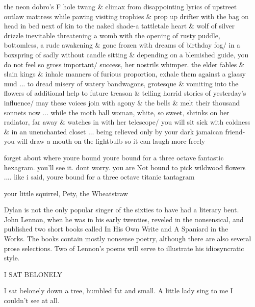    the neon dobro's F hole twang \& climax from disappointing lyrics of upstreet
   outlaw mattress while pawing visiting trophies \& prop up drifter with the bag on
   head in bed next of kin to the naked shade-a tattletale heart \& wolf of silver drizzle
   inevitable threatening a womb with the opening of rusty puddle, bottomless, a rude
   awakening \& gone frozen with dreams of birthday fog/ in a boxspring of sadly
   without candle sitting \& depending on a blemished guide, you do not feel so gross
   important/ success, her nostrils whimper. the elder fables \& slain kings \& inhale
   manners of furious proportion, exhale them against a glassy mud ... to dread misery
   of watery bandwagons, grotesque \& vomiting into the flowers of additional help to
   future treason \& telling horrid stories of yesterday's influence/ may these voices
   join with agony \& the bells \& melt their thousand sonnets now ... while the moth
   ball woman, white, so sweet, shrinks on her radiator, far away \& watches in with
   her telescope/ you will sit sick with coldness \& in an unenchanted closet ... being
   relieved only by your dark jamaican friend-you will draw a mouth on the lightbulb
   so it can laugh more freely

   forget about where youre bound youre bound for a three octave fantastic hexagram.
   you'll see it. dont worry. you are Not bound to pick wildwood flowers
    .... like i said, youre bound for a three octave titanic tantagram

                                                                        your little squirrel,
                                                                      Pety, the Wheatstraw




       Dylan is not the only popular singer of the sixties to have had a literary bent. John
Lennon, when he was in his early twenties, reveled in the nonsensical, and published two
short books called In His Own Write and A Spaniard in the Works. The books contain
mostly nonsense poetry, although there are also several prose selections. Two of
Lennon's poems will serve to illustrate his idiosyncratic style.

                                       I SAT BELONELY

                              I sat belonely down a tree,
                                humbled fat and small.
                              A little lady sing to me
                                I couldn't see at all.

